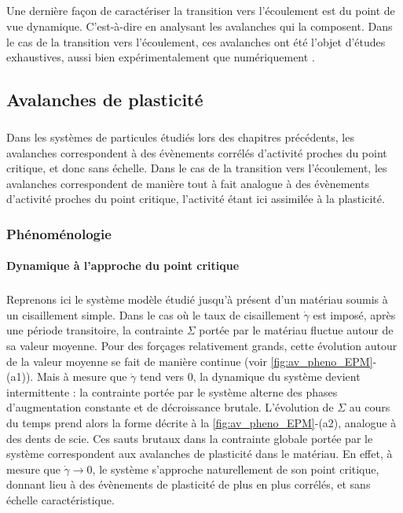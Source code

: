 \label{sec:AvYielding}

\subparagraph{}Une dernière façon de caractériser la transition vers l'écoulement est du point de vue dynamique. C'est-à-dire en analysant les avalanches qui la composent. Dans le cas de la transition vers l'écoulement, ces avalanches ont été l'objet d'études exhaustives, aussi bien expérimentalement que numériquement \cite{sun_plasticity_2010, lauridsen_shear-induced_2002, salerno_effect_2013, oyama_unified_2021, talamali_avalanches_2011, liu_driving_2016}.

\subsection{Avalanches de plasticité}

\subparagraph{}Dans les systèmes de particules étudiés lors des chapitres précédents, les avalanches correspondent à des évènements corrélés d'activité proches du point critique, et donc sans échelle. Dans le cas de la transition vers l'écoulement, les avalanches correspondent de manière tout à fait analogue à des évènements d'activité proches du point critique, l'activité étant ici assimilée à la plasticité.

\subsubsection{Phénoménologie}

\paragraph{Dynamique à l'approche du point critique}

\subparagraph{}Reprenons ici le système modèle étudié jusqu'à présent d'un matériau soumis à un cisaillement simple. Dans le cas où le taux de cisaillement $\dot{\gamma}$ est imposé, après une période transitoire, la contrainte $\Sigma$ portée par le matériau fluctue autour de sa valeur moyenne. Pour des forçages relativement grands, cette évolution autour de la valeur moyenne se fait de manière continue (voir \autoref{fig:av_pheno_EPM}-(a1)). Mais à mesure que $\dot{\gamma}$ tend vers 0, la dynamique du système devient intermittente \cite{nicolas_deformation_2018} : la contrainte portée par le système alterne des phases d'augmentation constante et de décroissance brutale. L'évolution de $\Sigma$ au cours du temps prend alors la forme décrite à la \autoref{fig:av_pheno_EPM}-(a2), analogue à des dents de scie. Ces sauts brutaux dans la contrainte globale portée par le système correspondent aux avalanches de plasticité dans le matériau. En effet, à mesure que $\dot{\gamma}\rightarrow 0$, le système s'approche naturellement de son point critique, donnant lieu à des évènements de plasticité de plus en plus corrélés, et sans échelle caractéristique.

